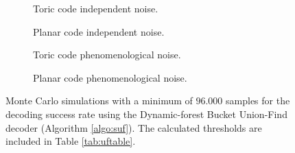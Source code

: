 \begin{figure}[htbp]
  \centering
  \begin{subfigure}[b]{0.49\textwidth}
      \begin{adjustbox}{Clip=0 1em 0 0}
        
      \end{adjustbox}
      \caption{Toric code independent noise.}
  \end{subfigure}
  \begin{subfigure}[b]{0.49\textwidth}
      \begin{adjustbox}{Clip=0 1em 0 0}
        
      \end{adjustbox}
      \caption{Planar code independent noise.}
  \end{subfigure}
  \begin{subfigure}[b]{0.49\textwidth}
      \begin{adjustbox}{Clip=0 1em 0 0}
        
      \end{adjustbox}
      \caption{Toric code phenomenological noise.}
  \end{subfigure}
  \begin{subfigure}[b]{0.49\textwidth}
      \begin{adjustbox}{Clip=0 1em 0 0}
        
      \end{adjustbox}
      \caption{Planar code phenomenological noise.}
  \end{subfigure}
  \caption{Monte Carlo simulations with a minimum of $96.000$ samples for the decoding success rate using the Dynamic-forest Bucket Union-Find decoder (Algorithm \ref{algo:suf}). The calculated thresholds are included in Table \ref{tab:uftable}.}
  \label{fig:threshold_dbuf}
\end{figure}


